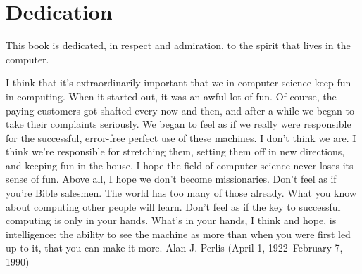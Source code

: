 
\chapter[chap:dedication]{Dedication}

This book is dedicated, in respect and admiration, to the spirit that
lives in the computer.

\startquotation[left]
   I think that it's extraordinarily important that we in computer science keep fun in computing.
   When it started out, it was an awful lot of fun.
   Of course, the paying customers got shafted every now and then,
   and after a while we began to take their complaints seriously.
   We began to feel as if we really were responsible for the successful,
   error-free perfect use of these machines.
   I don't think we are.
   I think we're responsible for stretching them,
   setting them off in new directions, and keeping fun in the house.
   I hope the field of computer science never loses its sense of fun.
   Above all, I hope we don't become missionaries.
   Don't feel as if you're Bible salesmen.
   The world has too many of those already.
   What you know about computing other people will learn.
   Don't feel as if the key to successful computing is only in your hands.
   What's in your hands, I think and hope, is intelligence:
   the ability to see the machine as more than when you were first led up to it,
   that you can make it more.
\stopquotation
Alan J. Perlis (April 1, 1922--February 7, 1990)
